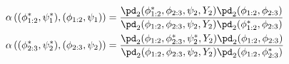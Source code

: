 \begin{align}
  \alpha \left((\phi_{1:2}^{*}, \psi_{1}^{*}), (\phi_{1:2}, \psi_{1})\right) &= 
  \frac {
    \pd_{2}(\phi_{1:2}^{*}, \phi_{2:3}, \psi_{2}, Y_{2})
    \pd_{2}(\phi_{1:2}, \phi_{2:3})
  } {
    \pd_{2}(\phi_{1:2}, \phi_{2:3}, \psi_{2}, Y_{2})
    \pd_{2}(\phi_{1:2}^{*}, \phi_{2:3})
  }
  \\
  \alpha \left((\phi_{2:3}^{*}, \psi_{2}^{*}), (\phi_{2:3}, \psi_{2})\right) &= 
  \frac {
    \pd_{2}(\phi_{1:2}, \phi_{2:3}^{*}, \psi_{2}^{*}, Y_{2})
    \pd_{2}(\phi_{1:2}, \phi_{2:3})
  } {
    \pd_{2}(\phi_{1:2}, \phi_{2:3}, \psi_{2}, Y_{2})
    \pd_{2}(\phi_{1:2}, \phi_{2:3}^{*})
  }
  \label{eqn:stage-two-acceptance-probabilities}
\end{align}
